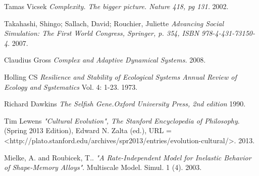 \documentclass[11pt,oneside,a4paper,openright]{report}
\begin{document}
\begin{thebibliography}{49}
	Tamas Vicsek
	\emph{Complexity. The bigger picture. Nature 418, pg 131.}
	2002.	


	Takahashi, Shingo; Sallach, David; Rouchier, Juliette
	\emph{Advancing Social Simulation: The First World Congress, Springer, p. 354, ISBN 978-4-431-73150-4}.
	2007.

	Claudius Gross
	\emph{Complex and Adaptive Dynamical Systems.}
	2008.

	Holling CS 
	\emph{Resilience and Stability of Ecological Systems Annual Review of Ecology and Systematics} Vol. 4: 1-23.
	1973. 

	
	Richard Dawkins
	\emph{The Selfish Gene.Oxford University Press, 2nd edition}	
	1990.

	Tim Lewens
	\emph{"Cultural Evolution", The Stanford Encyclopedia of Philosophy}. 
	(Spring 2013 Edition), Edward N. Zalta (ed.), 
	URL = <http://plato.stanford.edu/archives/spr2013/entries/evolution-cultural/>. 
	2013.

	Mielke, A. and Roubicek, T.. 
	\emph{"A Rate-Independent Model for Inelastic Behavior of Shape-Memory Alloys"}. 
	Multiscale Model. Simul. 1 (4). 
	2003.

\end{thebibliography}
\end{document}
